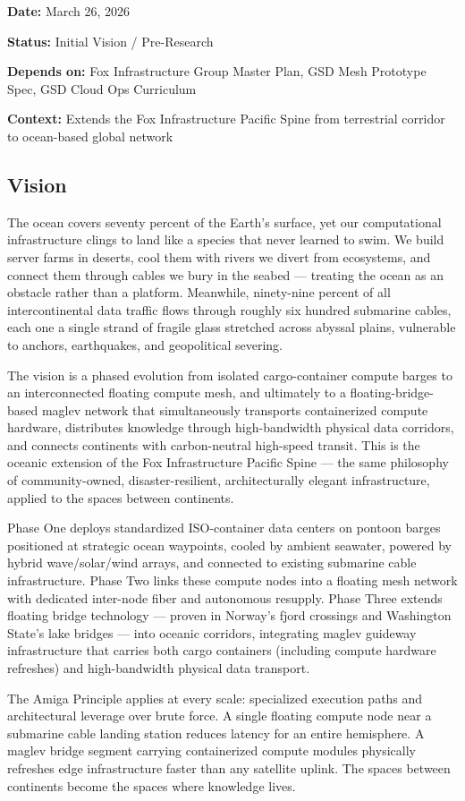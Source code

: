 \documentclass[11pt,letterpaper]{article}
\newcommand{\metafield}[2]{\textbf{\sffamily #1} #2\par}
\begin{document}
\metafield{Date:}{March 26, 2026}
\metafield{Status:}{Initial Vision / Pre-Research}
\metafield{Depends on:}{Fox Infrastructure Group Master Plan, GSD Mesh Prototype Spec, GSD Cloud Ops Curriculum}
\metafield{Context:}{Extends the Fox Infrastructure Pacific Spine from terrestrial corridor to ocean-based global network}

\subsection{Vision}

The ocean covers seventy percent of the Earth's surface, yet our computational infrastructure clings to land like a species that never learned to swim. We build server farms in deserts, cool them with rivers we divert from ecosystems, and connect them through cables we bury in the seabed --- treating the ocean as an obstacle rather than a platform. Meanwhile, ninety-nine percent of all intercontinental data traffic flows through roughly six hundred submarine cables, each one a single strand of fragile glass stretched across abyssal plains, vulnerable to anchors, earthquakes, and geopolitical severing.

The vision is a phased evolution from isolated cargo-container compute barges to an interconnected floating compute mesh, and ultimately to a floating-bridge-based maglev network that simultaneously transports containerized compute hardware, distributes knowledge through high-bandwidth physical data corridors, and connects continents with carbon-neutral high-speed transit. This is the oceanic extension of the Fox Infrastructure Pacific Spine --- the same philosophy of community-owned, disaster-resilient, architecturally elegant infrastructure, applied to the spaces between continents.

Phase One deploys standardized ISO-container data centers on pontoon barges positioned at strategic ocean waypoints, cooled by ambient seawater, powered by hybrid wave/solar/wind arrays, and connected to existing submarine cable infrastructure. Phase Two links these compute nodes into a floating mesh network with dedicated inter-node fiber and autonomous resupply. Phase Three extends floating bridge technology --- proven in Norway's fjord crossings and Washington State's lake bridges --- into oceanic corridors, integrating maglev guideway infrastructure that carries both cargo containers (including compute hardware refreshes) and high-bandwidth physical data transport.

The Amiga Principle applies at every scale: specialized execution paths and architectural leverage over brute force. A single floating compute node near a submarine cable landing station reduces latency for an entire hemisphere. A maglev bridge segment carrying containerized compute modules physically refreshes edge infrastructure faster than any satellite uplink. The spaces between continents become the spaces where knowledge lives.
\end{document}

